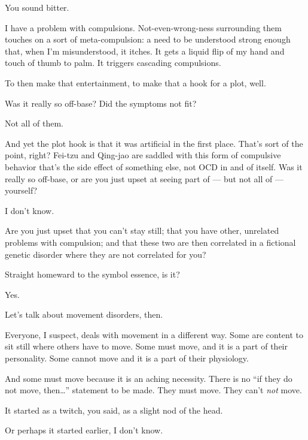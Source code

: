 \begin{paracol}{2}
\begin{leftcolumn}
\begin{ally}
You sound bitter.
\end{ally}
I have a problem with compulsions. Not-even-wrong-ness surrounding them touches on a sort of meta-compulsion: a need to be understood strong enough that, when I'm misunderstood, it itches. It gets a liquid flip of my hand and touch of thumb to palm. It triggers cascading compulsions.

To then make that entertainment, to make that a hook for a plot, well.

\begin{ally}
Was it really so off-base? Did the symptoms not fit?
\end{ally}
Not all of them.

\begin{ally}
And yet the plot hook is that it was artificial in the first place. That's sort of the point, right? Fei-tzu and Qing-jao are saddled with this form of compulsive behavior that's the side effect of something else, not OCD in and of itself. Was it really so off-base, or are you just upset at seeing part of --- but not all of --- yourself?
\end{ally}
I don't know.

\begin{ally}
Are you just upset that you can't stay still; that you have other, unrelated problems with compulsion; and that these two are then correlated in a fictional genetic disorder where they are not correlated for you?
\end{ally}
Straight homeward to the symbol essence, is it?

\begin{ally}
Yes.
\end{ally}
Let's talk about movement disorders, then.
\newpage

\noindent Everyone, I suspect, deals with movement in a different way. Some are content to sit still where others have to move. Some must move, and it is a part of their personality. Some cannot move and it is a part of their physiology.

And some must move because it is an aching necessity. There is no ``if they do not move, then\ldots{}'' statement to be made. They must move. They can't \emph{not} move.

\begin{ally}
It started as a twitch, you said, as a slight nod of the head.
\end{ally}
Or perhaps it started earlier, I don't know.


\end{leftcolumn}
\end{paracol}
